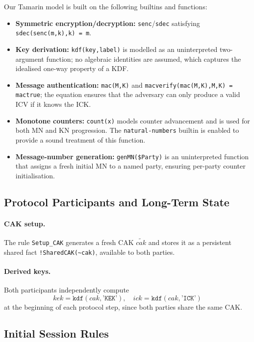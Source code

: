 Our Tamarin model is built on the following builtins and functions:
\begin{itemize}
  \item \textbf{Symmetric encryption/decryption:} \texttt{senc}/\texttt{sdec} satisfying \texttt{sdec(senc(m,k),k) = m}.
  \item \textbf{Key derivation:} \texttt{kdf(key,label)} is modelled as an uninterpreted two-argument function; no algebraic identities are assumed, which captures the idealised one-way property of a KDF.
  \item \textbf{Message authentication:} \texttt{mac(M,K)} and \texttt{macverify(mac(M,K),M,K) = mactrue}; the equation ensures that the adversary can only produce a valid ICV if it knows the ICK.
  \item \textbf{Monotone counters:} \texttt{count(x)} models counter advancement and is used for both MN and KN progression. The \texttt{natural-numbers} builtin is enabled to provide a sound treatment of this function.
  \item \textbf{Message-number generation:} \texttt{genMN(\$Party)} is an uninterpreted function that assigns a fresh initial MN to a named party, ensuring per-party counter initialisation.
\end{itemize}

\subsection{Protocol Participants and Long-Term State}

\paragraph{CAK setup.} The rule \texttt{Setup\_CAK} generates a fresh CAK $\tilde{\mathit{cak}}$ and stores it as a persistent shared fact \texttt{!SharedCAK(\textasciitilde cak)}, available to both parties.

\paragraph{Derived keys.} Both participants independently compute
\[
  \mathit{kek} = \mathtt{kdf}(\mathit{cak}, \texttt{'KEK'}),\quad
  \mathit{ick} = \mathtt{kdf}(\mathit{cak}, \texttt{'ICK'})
\]
at the beginning of each protocol step, since both parties share the same CAK.

\subsection{Initial Session Rules}

